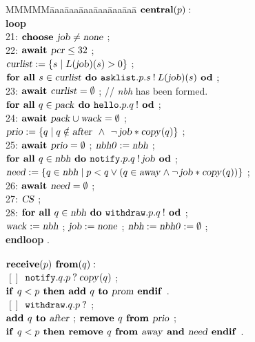 \documentclass[10pt]{article} \usepackage[english]{babel}
\newenvironment{tab}{\begin{tabbing}
MMMMM\=aaa\=aaa\=aaa\=aaa\=aaa\=aaa\= \kill}{\end{tabbing}}
\def\bar   {\mbox{$\,[ \! ]\,$}}
\def\S #1/{\mbox {\textsl{#1}}}
\def\B #1/{\mbox {\textbf{#1}}}
\def\T #1/{\mbox {\texttt{#1}}}
\def\Land   {\mbox{ $\;\land\;$ }}
\begin{document}
\begin{figure}[t]
\begin{tab}
  \> $ \B central/(p): $ \+\\
  \B loop/\\
  21: \>\> $ \B choose /\S job/\ne\S none/ $ ;\\
  22: \>\> $ \B await /\S pcr/ \leq 32 $ ;\\
  \>\> $ \S curlist/:= \{ s \mid L(\S job/)(s) > 0\} $ ;\\
  \>\> $ \B for all /s\in\S curlist/\B\ do /
  \T asklist/.p.s\:!\:L(\S job/)(s) \B\ od/ $ ;\\
  23: \>\> $ \B await /\S curlist/ = \emptyset $ ;
  // \S nbh/ has been formed.\\
  \>\> $ \B for all /q\in\S pack/ \B\ do /\T hello/.p.q\:!\B\ od/ $ ;\\
  24: \>\> $ \B await /\S pack/ \cup \S wack/ = \emptyset $ ;\\
  \>\> $ \S prio/ := \{q \mid q\notin \S after/ \Land
  \neg\, \S job/*\S copy/(q) \} $ ;\\
  25: \>\> $ \B await / \S prio/ = \emptyset $ ; $ \S nbh0/ := \S nbh/ $ ;\\
  \>\> $ \B for all /q\in\S nbh/ \B\ do /\T notify/.p.q\:!\:\S job/\B\ od/ $ ;\\
  \>\> $ \S need/:= \{q\in\S nbh/\mid p < q \lor (q\in \S away/
  \land \neg\,\S job/*\S copy/(q)) \} $ ;\\
  26: \>\> $ \B await / \S need/ = \emptyset $ ;\\
  27: \>\> $ \S CS/ $ ;\\
  28: \>\> $ \B for all /q\in\S nbh/ \B\ do /\T withdraw/.p.q\:!\B\ od/ $ ;\\
  \>\> $ \S wack/ := \S nbh/ $ ;
  $ \S job/ := \S none/ $ ; $\S nbh/ := \S nbh0/ := \emptyset $ ;\\
  \B endloop/ .
  \\
  \\
  $ \B receive/(p) \B\ from/(q): $\+ \\

  $ \bar $\> $  \T notify/.q.p \:?\:\S copy/(q) $ ;\\
  \> $ \B if /q < p \B\ then / \B add /q \B\ to / \S prom/\B\ endif/ $ .\\
  
  $ \bar $\> $  \T withdraw/.q.p\: ? $ ;\\
  \> $\B add /q\B\ to /\S after/ $ ;  $ \B remove /q\B\ from /\S prio/ $ ; \\
  \> $ \B if / q < p \B\ then /
  \B remove /q\B\ from /\S away/ \B\ and /\S need/ \B\ endif/ $ .\\


\end{tab}
\end{figure}
\end{document}
